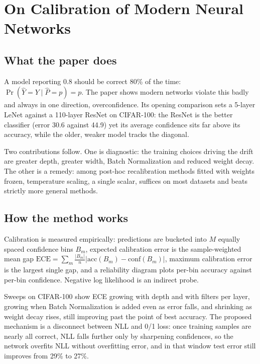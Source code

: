 \section{On Calibration of Modern Neural Networks}

\subsection{What the paper does}

A model reporting 0.8 should be correct 80\% of the time: $\Pr(\hat{Y}=Y \mid \hat{P}=p)=p$. The paper shows modern networks violate this badly and always in one direction, overconfidence. Its opening comparison sets a 5-layer LeNet against a 110-layer ResNet on CIFAR-100: the ResNet is the better classifier (error 30.6 against 44.9) yet its average confidence sits far above its accuracy, while the older, weaker model tracks the diagonal.

Two contributions follow. One is diagnostic: the training choices driving the drift are greater depth, greater width, Batch Normalization and reduced weight decay. The other is a remedy: among post-hoc recalibration methods fitted with weights frozen, temperature scaling, a single scalar, suffices on most datasets and beats strictly more general methods.

\subsection{How the method works}

Calibration is measured empirically: predictions are bucketed into $M$ equally spaced confidence bins $B_m$, expected calibration error is the sample-weighted mean gap $\mathrm{ECE}=\sum_{m}\frac{|B_m|}{n}\bigl|\mathrm{acc}(B_m)-\mathrm{conf}(B_m)\bigr|$, maximum calibration error is the largest single gap, and a reliability diagram plots per-bin accuracy against per-bin confidence. Negative log likelihood is an indirect probe.

Sweeps on CIFAR-100 show ECE growing with depth and with filters per layer, growing when Batch Normalization is added even as error falls, and shrinking as weight decay rises, still improving past the point of best accuracy. The proposed mechanism is a disconnect between NLL and 0/1 loss: once training samples are nearly all correct, NLL falls further only by sharpening confidences, so the network overfits NLL without overfitting error, and in that window test error still improves from 29\% to 27\%.

